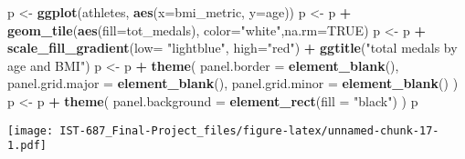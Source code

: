 \documentclass[]{article}
\newenvironment{Shaded}{\begin{snugshade}}{\end{snugshade}}
\newcommand{\DataTypeTok}[1]{\textcolor[rgb]{0.13,0.29,0.53}{#1}}
\newcommand{\KeywordTok}[1]{\textcolor[rgb]{0.13,0.29,0.53}{\textbf{#1}}}
\newcommand{\NormalTok}[1]{#1}
\newcommand{\OperatorTok}[1]{\textcolor[rgb]{0.81,0.36,0.00}{\textbf{#1}}}
\newcommand{\OtherTok}[1]{\textcolor[rgb]{0.56,0.35,0.01}{#1}}
\newcommand{\StringTok}[1]{\textcolor[rgb]{0.31,0.60,0.02}{#1}}
\begin{document}
\begin{Shaded}
\begin{Highlighting}[]
\NormalTok{p <-}\StringTok{ }\KeywordTok{ggplot}\NormalTok{(athletes, }\KeywordTok{aes}\NormalTok{(}\DataTypeTok{x=}\NormalTok{bmi_metric, }\DataTypeTok{y=}\NormalTok{age))}
\NormalTok{p <-}\StringTok{ }\NormalTok{p }\OperatorTok{+}\StringTok{ }\KeywordTok{geom_tile}\NormalTok{(}\KeywordTok{aes}\NormalTok{(}\DataTypeTok{fill=}\NormalTok{tot_medals), }\DataTypeTok{color=}\StringTok{"white"}\NormalTok{,}\DataTypeTok{na.rm=}\OtherTok{TRUE}\NormalTok{) }
\NormalTok{p <-}\StringTok{ }\NormalTok{p }\OperatorTok{+}\StringTok{ }\KeywordTok{scale_fill_gradient}\NormalTok{(}\DataTypeTok{low=} \StringTok{"lightblue"}\NormalTok{, }\DataTypeTok{high=}\StringTok{"red"}\NormalTok{) }\OperatorTok{+}\StringTok{ }\KeywordTok{ggtitle}\NormalTok{(}\StringTok{"total medals by age and BMI"}\NormalTok{)}
\NormalTok{p <-}\StringTok{ }\NormalTok{p }\OperatorTok{+}\StringTok{ }\KeywordTok{theme}\NormalTok{(}
  \DataTypeTok{panel.border =} \KeywordTok{element_blank}\NormalTok{(),}
  \DataTypeTok{panel.grid.major =} \KeywordTok{element_blank}\NormalTok{(),}
  \DataTypeTok{panel.grid.minor =} \KeywordTok{element_blank}\NormalTok{()}
\NormalTok{)}
\NormalTok{p <-}\StringTok{ }\NormalTok{p }\OperatorTok{+}\StringTok{ }\KeywordTok{theme}\NormalTok{(}
  \DataTypeTok{panel.background =} \KeywordTok{element_rect}\NormalTok{(}\DataTypeTok{fill =} \StringTok{"black"}\NormalTok{)}
\NormalTok{) }
\NormalTok{p }
\end{Highlighting}
\end{Shaded}

\texttt{[image: IST-687\_Final-Project\_files/figure-latex/unnamed-chunk-17-1.pdf]}
\end{document}
